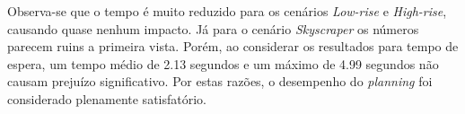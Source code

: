 Observa-se que o tempo é muito reduzido para os cenários \textit{Low-rise} e
\textit{High-rise}, causando quase nenhum impacto. Já para o cenário
\textit{Skyscraper} os números parecem ruins a primeira vista. Porém, ao
considerar os resultados para tempo de espera, um tempo médio de 2.13 segundos e
um máximo de 4.99 segundos não causam prejuízo significativo. Por estas razões,
o desempenho do \textit{planning} foi considerado plenamente satisfatório.